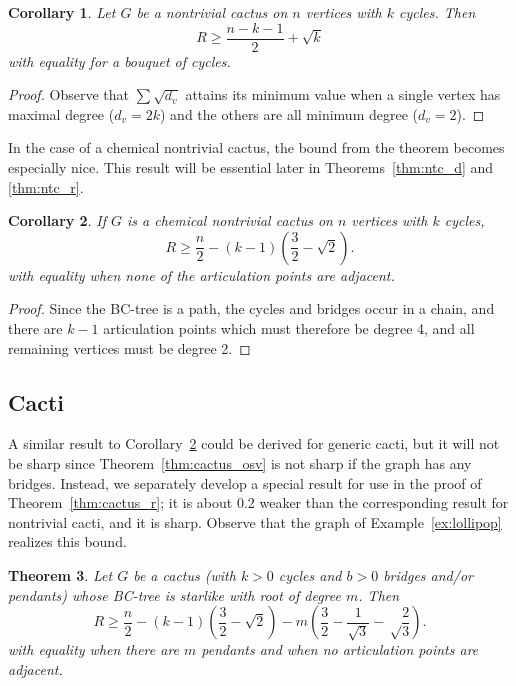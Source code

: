 \documentclass{amsart}
\newtheorem{thm}{Theorem}[section]%
\newtheorem{cor}[thm]{Corollary}
\theoremstyle{definition}
\begin{document}
\begin{cor}\label{cor:ntc_osv}
Let $G$ be a nontrivial cactus on $n$ vertices with $k$ cycles. Then
\[R \geq \frac{n - k - 1}{2} + \sqrt k\]
with equality for a bouquet of cycles.
\end{cor}

\begin{proof}
Observe that $\sum \sqrt{d_v}$ attains its minimum value when a single vertex has maximal degree ($d_v = 2k$) and the others are all minimum degree ($d_v=2$). 
\end{proof}

In the case of a chemical nontrivial cactus, the bound from the theorem becomes especially nice. This result will be essential later in Theorems~\ref{thm:ntc_d} and \ref{thm:ntc_r}.

\begin{cor}\label{cor:chemical_ntc_osv}
If $G$ is a chemical nontrivial cactus on $n$ vertices with $k$ cycles,
\[R \geq \frac{n}{2} - (k-1)\left(\frac{3}{2} - \sqrt 2\right).\]
with equality when none of the articulation points are adjacent.
\end{cor}

\begin{proof}
Since the BC-tree is a path, the cycles and bridges occur in a chain, and there are $k-1$ articulation points which must therefore be degree 4, and all remaining vertices must be degree 2.
\end{proof}


\subsection{Cacti}
A similar result to Corollary~\ref{cor:chemical_ntc_osv} could be derived for generic cacti, but it will not be sharp since Theorem~\ref{thm:cactus_osv} is not sharp if the graph has any bridges. Instead, we separately develop a special result for use in the proof of Theorem~\ref{thm:cactus_r}; it is about 0.2 weaker than the corresponding result for nontrivial cacti, and it is sharp. Observe that the graph of Example~\ref{ex:lollipop} realizes this bound. 


\begin{thm}\label{thm:star_cactus_osv}
Let $G$ be a cactus (with $k>0$ cycles and $b>0$ bridges and/or pendants) whose BC-tree is starlike with root of degree $m$. Then 
\[R \geq \frac{n}{2} - (k-1)\left(\frac{3}{2} - \sqrt 2 \right) - m\left(\frac{3}{2} - \frac{1}{\sqrt 3} - \sqrt\frac{2}{3}\right).\]
with equality when there are $m$ pendants and when no articulation points are adjacent.
\end{thm}
\end{document}
